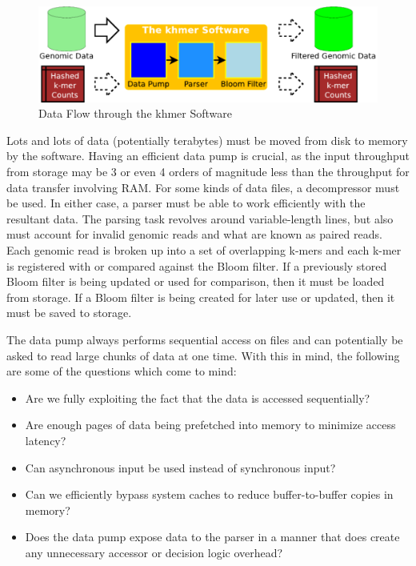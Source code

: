 \documentclass{article}
\begin{document}
\begin{figure}[ht!]
\centering
\includegraphics[scale=0.4]{data_flow.pdf}
\caption{Data Flow through the khmer Software}
\label{khmerDataFlow}
\end{figure}

Lots and lots of data (potentially terabytes) must be moved from disk to memory
by the software. Having an efficient data pump is crucial, as the input
throughput from storage may be 3 or even 4 orders of magnitude less than the
throughput for data transfer involving RAM. For some kinds of data files, a
decompressor must be used. In either case, a parser must be able to work
efficiently with the resultant data. The parsing task revolves around
variable-length lines, but also must account for invalid genomic reads and what
are known as paired reads. Each genomic read is broken up into a set of
overlapping k-mers and each k-mer is registered with or compared against the
Bloom filter. If a previously stored Bloom filter is being updated or used for
comparison, then it must be loaded from storage. If a Bloom filter is being
created for later use or updated, then it must be saved to storage.

The data pump always performs sequential access on files and can potentially be
asked to read large chunks of data at one time. With this in mind, the
following are some of the questions which come to mind:
\begin{itemize}
\item Are we fully exploiting the fact that the data is accessed sequentially?
\item Are enough pages of data being prefetched into memory to minimize access
latency?
\item Can asynchronous input be used instead of synchronous input?
\item Can we efficiently bypass system caches to reduce buffer-to-buffer copies
in memory?
\item Does the data pump expose data to the parser in a manner that
does create any unnecessary accessor or decision logic overhead?
\end{itemize}
\end{document}
